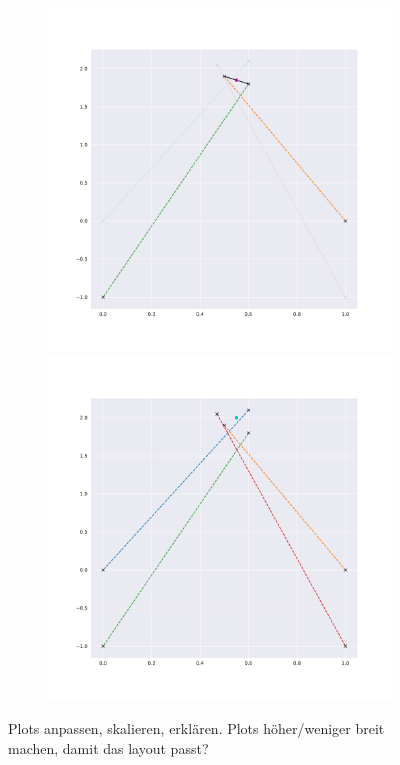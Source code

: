 \begin{figure}
\begin{subfigure}{0.23\textwidth}
        \includegraphics[width=0.9\linewidth]{Plots/stereo_magic_4.pdf}
        \includegraphics[width=0.9\linewidth]{Plots/stereo_magic_result.pdf}
    \end{subfigure}
    \caption{Plots anpassen, skalieren, erklären. Plots höher/weniger breit machen, damit das layout passt?}
    \label{fig:stereo_disp}
\end{figure}

